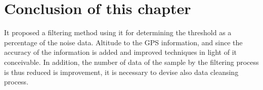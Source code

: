 



\section{Conclusion of this chapter}
It proposed a filtering method using it for determining the threshold as a percentage of the noise data. Altitude to the GPS information, and since the accuracy of the information is added and improved techniques in light of it conceivable. In addition, the number of data of the sample by the filtering process is thus reduced is improvement, it is necessary to devise also data cleansing process.


\newpage
